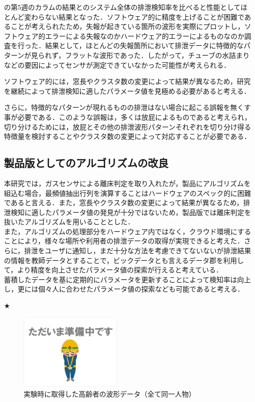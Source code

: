 の第5週のカラムの結果とのシステム全体の排泄検知率を比べると性能としてほとんど変わらない結果となった．ソフトウェア的に精度を上げることが困難であることが考えられたため，失報が起きている箇所の波形を実際にプロットし，ソフトウェア的エラーによる失報なのかハードウェア的エラーによるものなのか調査を行った．結果として，ほとんどの失報箇所において排泄データに特徴的なパターンが見られず，フラットな波形であった．したがって，チューブの水詰まりなどの要因によってセンサが測定できていなかった可能性が考えられる．

ソフトウェア的には，窓長やクラスタ数の変更によって結果が異なるため，研究を継続によって排泄検知に適したパラメータ値を見極める必要があると考える．

さらに，特徴的なパターンが現れるものの排泄はない場合に起こる誤報を無くす事が必要である．このような誤報は，多くは放屁によるものであると考えられ，切り分けるためには，放屁とその他の排泄波形パターンそれぞれを切り分け得る特徴量を検討することやクラスタ数の変更によって対応することが必要である．

\subsection{製品版としてのアルゴリズムの改良}\label{chap:3.3.5}
本研究では，ガスセンサによる離床判定を取り入れたが，製品にアルゴリズムを組込む場合，最頻値抽出行列を演算することはハードウェアのスペック的に困難であると言える．また，窓長やクラスタ数の変更によって結果が異なるため，排泄検知に適したパラメータ値の発見が十分ではないため，製品版では離床判定を抜いたアルゴリズムを用いることとした．\\
また，アルゴリズムの処理部分をハードウェア内ではなく，クラウド環境にすることにより，様々な場所や利用者の排泄データの取得が実現できると考えた．さらに，排泄をユーザに通知し，まだ十分な方法を考慮できてないないが排泄結果の情報を教師データとすることで，ビックデータとも言えるデータ郡を利用して，より精度を向上させたパラメータ値の探索が行えると考えている．\\
蓄積したデータを基に定期的にパラメータを更新することによって検知率は向上し，更には個々人に合わせたパラメータ値の探索なども可能であると考える．

★
\begin{figure}[htbp]
   \centering
   \includegraphics[width=5cm]{./fig/temp.eps}
   \caption{実験時に取得した高齢者の波形データ（全て同一人物）}
   \label{mic17a}
\end{figure}

